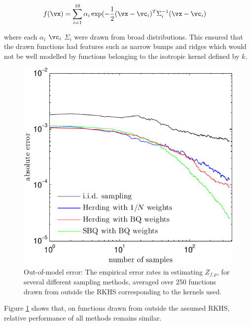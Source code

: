 \begin{align}
f(\vx) & = \sum_{i=1}^{10} \alpha_i \exp(-\frac{1}{2} (\vx -\vc_i)^T \Sigma_i^{-1} (\vx -\vc_i)
\end{align}

where each $\alpha_i$ $\vc_i$ $\Sigma_i$ were drawn from broad distributions. This ensured that the drawn functions had features such as narrow bumps and ridges which would not be well modelled by functions belonging to the isotropic kernel defined by $k$.

\begin{figure}[h]
\centering
\includegraphics[width=.8\columnwidth]{figs/herding/error_curve_outmodel_400_v3}
\caption[Out-of-model error of Bayeisan quadrature, herding and random sampling]{Out-of-model error: The empirical error rates in estimating $Z_{f,p}$, for several different sampling methods, averaged over 250 functions drawn from outside the RKHS corresponding to the kernels used.}
\label{fig:error_curve_outmodel}
\end{figure}

Figure \ref{fig:error_curve_outmodel} shows that, on functions drawn from outside the assumed RKHS, relative performance of all methods remains similar.


